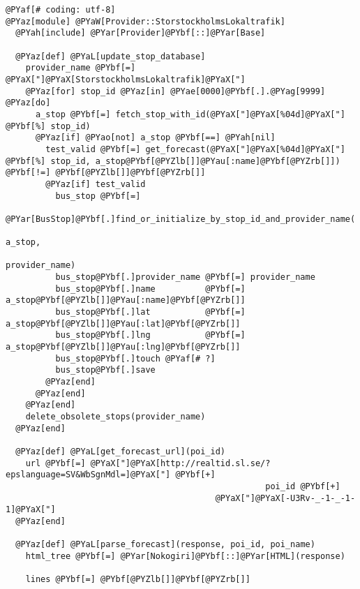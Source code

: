 \begin{Verbatim}[commandchars=@\[\]]
@PYaf[# coding: utf-8]
@PYaz[module] @PYaW[Provider::StorstockholmsLokaltrafik]
  @PYah[include] @PYar[Provider]@PYbf[::]@PYar[Base]

  @PYaz[def] @PYaL[update_stop_database]
    provider_name @PYbf[=] @PYaX["]@PYaX[StorstockholmsLokaltrafik]@PYaX["]
    @PYaz[for] stop_id @PYaz[in] @PYae[0000]@PYbf[.].@PYag[9999] @PYaz[do]
      a_stop @PYbf[=] fetch_stop_with_id(@PYaX["]@PYaX[%04d]@PYaX["] @PYbf[%] stop_id)
      @PYaz[if] @PYao[not] a_stop @PYbf[==] @PYah[nil]
        test_valid @PYbf[=] get_forecast(@PYaX["]@PYaX[%04d]@PYaX["] @PYbf[%] stop_id, a_stop@PYbf[@PYZlb[]]@PYau[:name]@PYbf[@PYZrb[]]) @PYbf[!=] @PYbf[@PYZlb[]]@PYbf[@PYZrb[]]
        @PYaz[if] test_valid
          bus_stop @PYbf[=]
            @PYar[BusStop]@PYbf[.]find_or_initialize_by_stop_id_and_provider_name(
                                                                a_stop,
                                                         provider_name)
          bus_stop@PYbf[.]provider_name @PYbf[=] provider_name
          bus_stop@PYbf[.]name          @PYbf[=] a_stop@PYbf[@PYZlb[]]@PYau[:name]@PYbf[@PYZrb[]]
          bus_stop@PYbf[.]lat           @PYbf[=] a_stop@PYbf[@PYZlb[]]@PYau[:lat]@PYbf[@PYZrb[]]
          bus_stop@PYbf[.]lng           @PYbf[=] a_stop@PYbf[@PYZlb[]]@PYau[:lng]@PYbf[@PYZrb[]]
          bus_stop@PYbf[.]touch @PYaf[# ?]
          bus_stop@PYbf[.]save
        @PYaz[end]
      @PYaz[end]
    @PYaz[end]
    delete_obsolete_stops(provider_name)
  @PYaz[end]

  @PYaz[def] @PYaL[get_forecast_url](poi_id)
    url @PYbf[=] @PYaX["]@PYaX[http://realtid.sl.se/?epslanguage=SV&WbSgnMdl=]@PYaX["] @PYbf[+]
                                                    poi_id @PYbf[+]
                                          @PYaX["]@PYaX[-U3Rv-_-1-_-1-1]@PYaX["]
  @PYaz[end]
  
  @PYaz[def] @PYaL[parse_forecast](response, poi_id, poi_name)
    html_tree @PYbf[=] @PYar[Nokogiri]@PYbf[::]@PYar[HTML](response)

    lines @PYbf[=] @PYbf[@PYZlb[]]@PYbf[@PYZrb[]]


\end{Verbatim}
